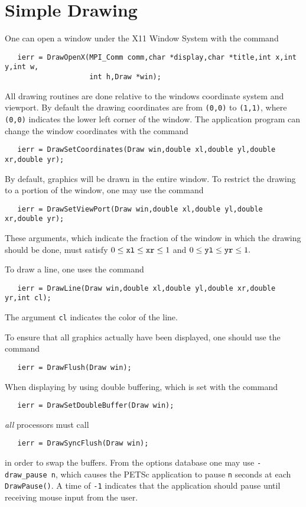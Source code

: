 \section{Simple Drawing}

One can open a window under the X11 Window System with the
command  
\begin{verbatim}
   ierr = DrawOpenX(MPI_Comm comm,char *display,char *title,int x,int y,int w,
                    int h,Draw *win);
\end{verbatim}
All drawing routines are done relative to the windows coordinate system 
and viewport. By default the drawing coordinates are from {\tt (0,0)} to 
{\tt (1,1)}, where {\tt (0,0)} indicates the lower left corner of the 
window. The application program can change the window coordinates with the 
command  
\begin{verbatim}
   ierr = DrawSetCoordinates(Draw win,double xl,double yl,double xr,double yr);
\end{verbatim}
By default, graphics will be drawn in the entire window. To restrict the 
drawing to a portion of the window, one may 
use the command 
\begin{verbatim}
   ierr = DrawSetViewPort(Draw win,double xl,double yl,double xr,double yr);
\end{verbatim}
These arguments, which indicate the fraction of the window in which the 
drawing should be done, must satisfy 
$ 0 \le {\tt xl} \le {\tt xr} \le 1 $ and $ 0 \le {\tt yl} \le {\tt yr} \le 1.$ 

To draw a line, one uses
 the command  
\begin{verbatim}
   ierr = DrawLine(Draw win,double xl,double yl,double xr,double yr,int cl);
\end{verbatim}
The argument {\tt cl} indicates the color of the line.

To ensure that all graphics actually have been displayed, one should use 
 the
command 
\begin{verbatim}
   ierr = DrawFlush(Draw win);
\end{verbatim}
When displaying by using double buffering, which is set with the
command  
\begin{verbatim}
   ierr = DrawSetDoubleBuffer(Draw win);
\end{verbatim}
{\em all} processors must call 
\begin{verbatim}
   ierr = DrawSyncFlush(Draw win);
\end{verbatim}
in order to swap the buffers. From the options database one may use 
{\tt -draw\_pause n}, which  causes the PETSc application 
to pause {\tt n} seconds at each {\tt DrawPause()}. A time of {\tt -1}
indicates that the application should pause until receiving mouse 
input from the user.

